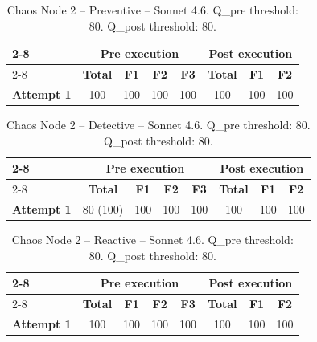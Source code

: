 \begin{table}[h]
\centering
\begin{tabular}{l|cccc|ccc|}
\cline{2-8}
& \multicolumn{4}{c|}{\textbf{Pre execution}} & \multicolumn{3}{c|}{\textbf{Post execution}} \\
\cline{2-8}
& \textbf{Total} & \textbf{F1} & \textbf{F2} & \textbf{F3} & \textbf{Total} & \textbf{F1} & \textbf{F2} \\
\hline
\textbf{Attempt 1} & 100 & 100 & 100 & 100 & 100 & 100 & 100 \\
\hline
\end{tabular}
\caption{Chaos Node 2 -- Preventive -- Sonnet 4.6. Q\_pre threshold: 80. Q\_post threshold: 80.}
\label{tab:cn2_preventive_sonnet46}
\end{table}

\begin{table}[h]
\centering
\begin{tabular}{l|cccc|ccc|}
\cline{2-8}
& \multicolumn{4}{c|}{\textbf{Pre execution}} & \multicolumn{3}{c|}{\textbf{Post execution}} \\
\cline{2-8}
& \textbf{Total} & \textbf{F1} & \textbf{F2} & \textbf{F3} & \textbf{Total} & \textbf{F1} & \textbf{F2} \\
\hline
\textbf{Attempt 1} & 80 (100) & 100 & 100 & 100 & 100 & 100 & 100 \\
\hline
\end{tabular}
\caption{Chaos Node 2 -- Detective -- Sonnet 4.6. Q\_pre threshold: 80. Q\_post threshold: 80.}
\label{tab:cn2_detective_sonnet46}
\end{table}


\begin{table}[h]
\centering
\begin{tabular}{l|cccc|ccc|}
\cline{2-8}
& \multicolumn{4}{c|}{\textbf{Pre execution}} & \multicolumn{3}{c|}{\textbf{Post execution}} \\
\cline{2-8}
& \textbf{Total} & \textbf{F1} & \textbf{F2} & \textbf{F3} & \textbf{Total} & \textbf{F1} & \textbf{F2} \\
\hline
\textbf{Attempt 1} & 100 & 100 & 100 & 100 & 100 & 100 & 100 \\
\hline
\end{tabular}
\caption{Chaos Node 2 -- Reactive -- Sonnet 4.6. Q\_pre threshold: 80. Q\_post threshold: 80.}
\label{tab:cn2_reactive_sonnet46}
\end{table}

